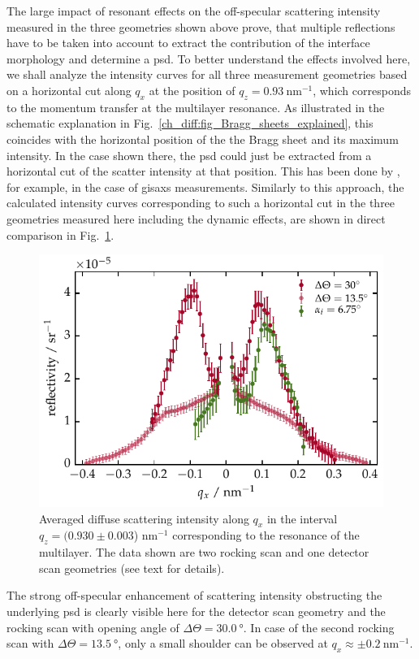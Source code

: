 The large impact of resonant effects on the off-specular scattering intensity measured in the three geometries shown above prove, that multiple reflections have to be taken into account to extract the contribution of the interface morphology and determine a \gls{psd}. To better understand the effects involved here, we shall analyze the intensity curves for all three measurement geometries based on a horizontal cut along $q_x$ at the position of $q_z=\SI{0.93}{\nano\meter^{-1}}$, which corresponds to the momentum transfer at the multilayer resonance. As illustrated in the schematic explanation in Fig.~\ref{ch_diff:fig_Bragg_sheets_explained}, this coincides with the horizontal position of the the Bragg sheet and its maximum intensity. In the case shown there, the \gls{psd} could just be extracted from a horizontal cut of the scatter intensity at that position. This has been done by \textcite{siffalovic_characterization_2009}, for example, in the case of \gls{gisaxs} measurements. Similarly to this approach, the calculated intensity curves corresponding to such a horizontal cut in the three geometries measured here including the dynamic effects, are shown in direct comparison in Fig.~\ref{ch_diff:fig_PTB17_qx_cuts_different_geometries}.
\begin{figure}[htbp]
	\includegraphics{img/PTB17_diffuse_BraggSheet_DetectorAndRocking} \caption[Averaged diffuse scattering intensity along the Bragg sheet resonance.]{Averaged diffuse scattering intensity along $q_x$ in the interval $q_z=(0.930 \pm 0.003$) nm$^{-1}$ corresponding to the resonance of the multilayer. The data shown are two rocking scan and one detector scan geometries (see text for details).} \label{ch_diff:fig_PTB17_qx_cuts_different_geometries}
\end{figure}
The strong off-specular enhancement of scattering intensity obstructing the underlying \gls{psd} is clearly visible here for the detector scan geometry and the rocking scan with opening angle of $\Delta\Theta = \SI{30.0}{\degree}$. In case of the second rocking scan with $\Delta\Theta = \SI{13.5}{\degree}$, only a small shoulder can be observed at $q_x \approx \pm \SI{0.2}{\nano\meter^{-1}}$.

